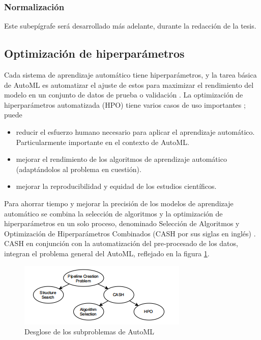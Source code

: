 \subsubsection*{Normalización}
Este subepígrafe será desarrollado más adelante, durante la redacción de la tesis.

\subsection{Optimización de hiperparámetros}
Cada sistema de aprendizaje automático tiene hiperparámetros, y la tarea básica de AutoML es automatizar el ajuste de estos para maximizar el rendimiento del modelo en un conjunto de datos de prueba o validación \citep{hastie2009elements}. La optimización de hiperparámetros automatizada (HPO) tiene varios casos de uso importantes \citep{hutter2019automated}; puede
\begin{itemize}
	\item reducir el esfuerzo humano necesario para aplicar el aprendizaje automático. Particularmente importante en el contexto de AutoML.
	\item mejorar el rendimiento de los algoritmos de aprendizaje automático (adaptándolos al problema en cuestión).
	\item mejorar la reproducibilidad y equidad de los estudios científicos.
\end{itemize}
Para ahorrar tiempo y mejorar la precisión de los modelos de aprendizaje automático se combina la selección de algoritmos y la optimización de hiperparámetros en un solo proceso, denominado Selección de Algoritmos y Optimización de Hiperparámetros Combinados (CASH por sus siglas en inglés) \citep{tuggener2019automated}. \\
CASH en conjunción con la automatización del pre-procesado de los datos, integran el problema general del AutoML, reflejado en la figura \ref{fig:desglose-de-los-subproblemas-de-automl}. 
\begin{figure}[H]
	\centering
	\includegraphics[width=0.6\linewidth]{"figuras/capi 1/Desglose de los subproblemas de AutoML"}
	\caption{Desglose de los subproblemas de AutoML \citep{zoller2021benchmark}}
	\label{fig:desglose-de-los-subproblemas-de-automl}
\end{figure} 
